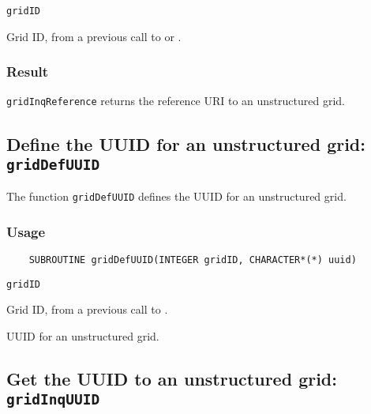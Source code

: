 \hspace*{4mm}\begin{minipage}[]{15cm}
\begin{deflist}{\tt gridID\ }
\item[{\tt gridID}]
Grid ID, from a previous call to {} or {}.

\end{deflist}
\end{minipage}

\subsubsection*{Result}

{\tt gridInqReference} returns the reference URI to an unstructured grid.


\subsection{Define the UUID for an unstructured grid: {\tt gridDefUUID}}
\label{gridDefUUID}

The function {\tt gridDefUUID} defines the UUID for an unstructured grid.

\subsubsection*{Usage}

\begin{verbatim}
    SUBROUTINE gridDefUUID(INTEGER gridID, CHARACTER*(*) uuid)
\end{verbatim}

\hspace*{4mm}\begin{minipage}[]{15cm}
\begin{deflist}{\tt gridID\ }
\item[{\tt gridID}]
Grid ID, from a previous call to {}.
\item[{\tt uuid}]
UUID for an unstructured grid.

\end{deflist}
\end{minipage}


\subsection{Get the UUID to an unstructured grid: {\tt gridInqUUID}}
\label{gridInqUUID}

